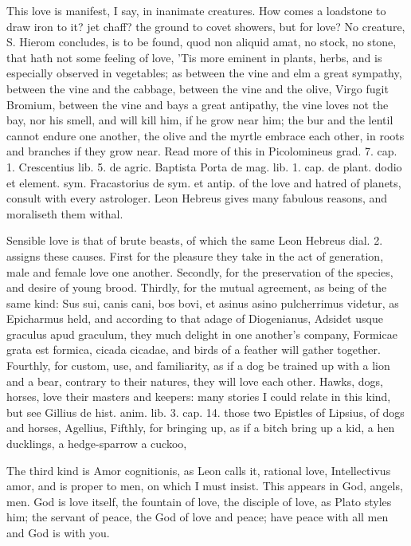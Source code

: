 {This love is manifest, I say, in inanimate creatures. How comes a
loadstone to draw iron to it? jet chaff? the ground to covet showers,
but for love? No creature, S. Hierom concludes, is to be found, quod
non aliquid amat, no stock, no stone, that hath not some feeling of
love, 'Tis more eminent in plants, herbs, and is especially observed in
vegetables; as between the vine and elm a great sympathy, between the
vine and the cabbage, between the vine and the olive,  Virgo
fugit Bromium, between the vine and bays a great antipathy, the vine
loves not the bay, nor his smell, and will kill him, if he grow
near him; the bur and the lentil cannot endure one another, the olive
and the myrtle embrace each other, in roots and branches if they
grow near. Read more of this in Picolomineus grad. 7. cap. 1.
Crescentius lib. 5. de agric. Baptista Porta de mag. lib. 1. cap. de
plant. dodio et element. sym. Fracastorius de sym. et antip. of the
love and hatred of planets, consult with every astrologer. Leon Hebreus
gives many fabulous reasons, and moraliseth them withal.

Sensible love is that of brute beasts, of which the same Leon Hebreus
dial. 2. assigns these causes. First for the pleasure they take in the
act of generation, male and female love one another. Secondly, for the
preservation of the species, and desire of young brood. Thirdly, for
the mutual agreement, as being of the same kind: Sus sui, canis cani,
bos bovi, et asinus asino pulcherrimus videtur, as Epicharmus held, and
according to that adage of Diogenianus, Adsidet usque graculus apud
graculum, they much delight in one another's company, Formicae
grata est formica, cicada cicadae, and birds of a feather will gather
together. Fourthly, for custom, use, and familiarity, as if a dog be
trained up with a lion and a bear, contrary to their natures, they will
love each other. Hawks, dogs, horses, love their masters and keepers:
many stories I could relate in this kind, but see Gillius de hist.
anim. lib. 3. cap. 14. those two Epistles of Lipsius, of dogs and
horses, Agellius, \etc{} Fifthly, for bringing up, as if a bitch bring up
a kid, a hen ducklings, a hedge-sparrow a cuckoo, \etc{}

The third kind is Amor cognitionis, as Leon calls it, rational love,
Intellectivus amor, and is proper to men, on which I must insist. This
appears in God, angels, men. God is love itself, the fountain of love,
the disciple of love, as Plato styles him; the servant of peace, the
God of love and peace; have peace with all men and God is with you.

}
